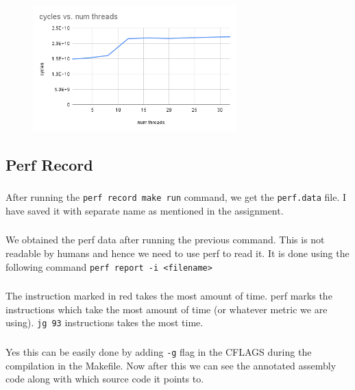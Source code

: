\documentclass{article}
\begin{document}
\begin{figure}[H]
\centering
\includegraphics[width=0.7\textwidth]{images/cycles_threads.png}
\end{figure}

\subsection{Perf Record}
\subsubsection{}
After running the \texttt{perf record make run} command, we get the \texttt{perf.data} file. I have saved it with separate name as mentioned in the assignment.

\subsubsection{}
We obtained the perf data after running the previous command. This is not readable by humans and hence we need to use perf to read it. It is done using the following command \texttt{perf report -i <filename>}

\subsubsection{}
The instruction marked in red takes the most amount of time. perf marks the instructions which take the most amount of time (or whatever metric we are using). \texttt{jg 93} instructions takes the most time.

\subsubsection{}
Yes this can be easily done by adding \texttt{-g} flag in the CFLAGS during the compilation in the Makefile. Now after this we can see the annotated assembly code along with which source code it points to.
\end{document}

